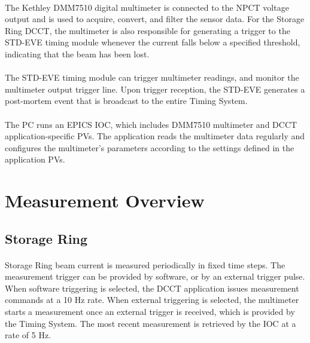 \documentclass[openany]{article}
\begin{document}
	\paragraph{} The Kethley DMM7510 digital multimeter is connected to the NPCT voltage output and is used to acquire, convert, and filter the sensor data. For the Storage Ring DCCT, the multimeter is also responsible for generating a trigger to the STD-EVE timing module whenever the current falls below a specified threshold, indicating that the beam has been lost.

	\paragraph{} The STD-EVE timing module can trigger multimeter readings, and monitor the multimeter output trigger line. Upon trigger reception, the STD-EVE generates a post-mortem event that is broadcast to the entire Timing System.

	\paragraph{} The PC runs an EPICS IOC, which includes DMM7510 multimeter and DCCT application-specific PVs. The application reads the multimeter data regularly and configures the multimeter's parameters according to the settings defined in the application PVs.

\section{Measurement Overview}

	\subsection{Storage Ring} 

		\paragraph{} Storage Ring beam current is measured periodically in fixed time steps. The measurement trigger can be provided by software, or by an external trigger pulse. When software triggering is selected, the DCCT application issues measurement commands at a 10 Hz rate. When external triggering is selected, the multimeter starts a measurement once an external trigger is received, which is provided by the Timing System. The most recent measurement is retrieved by the IOC at a rate of 5 Hz.
\end{document}
